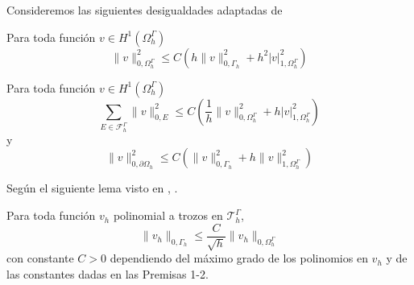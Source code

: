 Consideremos las siguientes desigualdades adaptadas de 
\cite[Lema 3.1 y Lema 3.4]{lozinski2019cutfem}
\begin{lema}
	\label{lema:trazaraiz}
	Para toda función $v\in H^1(\Omega_h^\Gamma)$ 
	\[
	\|v\|^2_{0,\Omega^\Gamma_h}
	\leq C \left( h\|v\|^2_{0,\Gamma_h} + h^2 |v|^2_{1,\Omega^\Gamma_h}\right)
	\]
\end{lema}
\begin{lema}
	\label{lema:traza}
	Para toda función $v\in H^1(\Omega_h^\Gamma)$ 
	\[
	\sum_{E\in\mathcal{F}_h^\Gamma} \|v\|^2_{0,E} \leq C \left( \frac{1}{h}\|v\|^2_{0,\Omega_h^\Gamma} + h |v|^2_{1,\Omega^\Gamma_h}\right)
	\]  y
	\[
	\|v\|^2_{0,\partial\Omega_h} \leq C \left( \|v\|^2_{0,\Gamma_h} + h\|v\|^2_{1,\Omega^\Gamma_h}\right)
	\]
\end{lema}
Según el siguiente lema visto en 
\cite[Lema 3.5]{duprez2022varphi}, \cite[Lema 1.46]{di2011mathematical}.
\begin{lema}\label{lema:trazaq}
	Para toda función $v_h$ polinomial a trozos en $\mathcal{T}_h^\Gamma$, \[\|v_h\|_{0,\Gamma_h} \leq \frac{C}{\sqrt{h}} \|v_h\|_{0,\Omega^\Gamma_h}\]
	con constante $C>0$ dependiendo del máximo grado de los polinomios en $v_h$ y de las constantes dadas en las Premisas 1-2.
\end{lema}	

